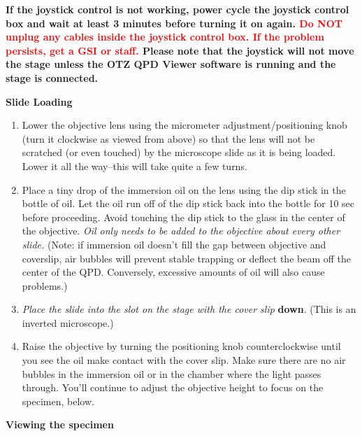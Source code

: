 \documentclass{../lab}
\begin{document}
\textbf{If the joystick control is not working, power cycle the joystick control box and wait at least 3 minutes before turning it on again. \textcolor{red}{Do NOT unplug any cables inside the joystick control box. If the problem persists, get a GSI or staff.} Please note that the joystick will not move the stage unless the OTZ QPD Viewer software is running and the stage is connected.}

\textbf{Slide Loading}

\begin{enumerate}
    \item Lower the objective lens using the micrometer adjustment/positioning knob (turn it clockwise as viewed from above) so that the lens will not be scratched (or even touched) by the microscope slide as it is being loaded. Lower it all the way--this will take quite a few turns.

    \item Place a tiny drop of the immersion oil on the lens using the dip stick in the bottle of oil. Let the oil run off of the dip stick back into the bottle for 10 sec before proceeding. Avoid touching the dip stick to the glass in the center of the objective. \emph{Oil only needs to be added to the objective about every other slide.} (Note: if immersion oil doesn't fill the gap between objective and coverslip, air bubbles will prevent stable trapping or deflect the beam off the center of the QPD. Conversely, excessive amounts of oil will also cause problems.)

    \item \emph{Place the slide into the slot on the stage with the cover slip} \textbf{down}. (This is an inverted microscope.)

    \item Raise the objective by turning the positioning knob counterclockwise until you see the oil make contact with the cover slip. Make sure there are no air bubbles in the immersion oil or in the chamber where the light passes through. You'll continue to adjust the objective height to focus on the specimen, below.
\end{enumerate}

\textbf{Viewing the specimen}
\end{document}
